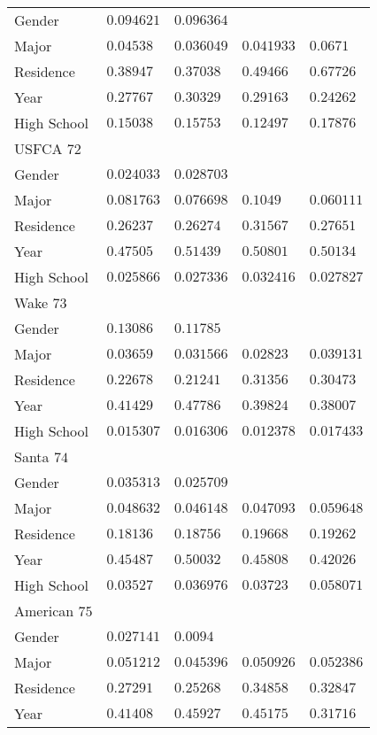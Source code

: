 \begin{center}
\begin{longtable}{|l|l|l|l|l|}
Gender & $0.094621$ & $0.096364$ & & \\
Major & $0.04538$ & $0.036049$ & $0.041933$ & $0.0671$ \\
Residence & $0.38947$ & $0.37038$ & $0.49466$ & $0.67726$ \\
Year & $0.27767$ & $0.30329$ & $0.29163$ & $0.24262$ \\
High School & $0.15038$ & $0.15753$ & $0.12497$ & $0.17876$ \\ \hline \hline
USFCA $72$ & & &   \\ \hline
Gender & $0.024033$ & $0.028703$ & & \\
Major & $0.081763$ & $0.076698$ & $0.1049$ & $0.060111$ \\
Residence & $0.26237$ & $0.26274$ & $0.31567$ & $0.27651$ \\
Year & $0.47505$ & $0.51439$ & $0.50801$ & $0.50134$ \\
High School & $0.025866$ & $0.027336$ & $0.032416$ & $0.027827$ \\ \hline \hline
Wake $73$ & & &   \\ \hline
Gender & $0.13086$ & $0.11785$ & & \\
Major & $0.03659$ & $0.031566$ & $0.02823$ & $0.039131$ \\
Residence & $0.22678$ & $0.21241$ & $0.31356$ & $0.30473$ \\
Year & $0.41429$ & $0.47786$ & $0.39824$ & $0.38007$ \\
High School & $0.015307$ & $0.016306$ & $0.012378$ & $0.017433$ \\ \hline \hline
Santa $74$ & & &   \\ \hline
Gender & $0.035313$ & $0.025709$ & & \\
Major & $0.048632$ & $0.046148$ & $0.047093$ & $0.059648$ \\
Residence & $0.18136$ & $0.18756$ & $0.19668$ & $0.19262$ \\
Year & $0.45487$ & $0.50032$ & $0.45808$ & $0.42026$ \\
High School & $0.03527$ & $0.036976$ & $0.03723$ & $0.058071$ \\ \hline \hline
American $75$ & & &   \\ \hline
Gender & $0.027141$ & $0.0094$ & & \\
Major & $0.051212$ & $0.045396$ & $0.050926$ & $0.052386$ \\
Residence & $0.27291$ & $0.25268$ & $0.34858$ & $0.32847$ \\
Year & $0.41408$ & $0.45927$ & $0.45175$ & $0.31716$ \\

\end{longtable}
\end{center}
